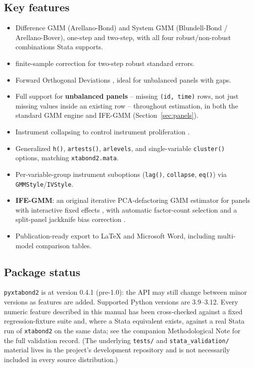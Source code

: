 \documentclass[11pt,a4paper]{article}
\newcommand{\pkg}{\texttt{pyxtabond2}}
\begin{document}
\subsection{Key features}
\begin{itemize}[nosep]
  \item Difference GMM (Arellano-Bond) and System GMM (Blundell-Bond /
        Arellano-Bover), one-step and two-step, with all four
        robust/non-robust combinations Stata supports.
  \item \citet{Windmeijer2005} finite-sample correction for two-step robust
        standard errors.
  \item Forward Orthogonal Deviations \citep{ArellanoBover1995}, ideal for
        unbalanced panels with gaps.
  \item Full support for \textbf{unbalanced panels} -- missing
        \texttt{(id, time)} rows, not just missing values inside an
        existing row -- throughout estimation, in both the standard GMM
        engine and IFE-GMM (Section~\ref{sec:panels}).
  \item Instrument collapsing to control instrument proliferation
        \citep{Roodman2009b}.
  \item Generalized \texttt{h()}, \texttt{artests()}, \texttt{arlevels}, and
        single-variable \texttt{cluster()} options, matching \texttt{xtabond2.mata}.
  \item Per-variable-group instrument suboptions (\texttt{lag()},
        \texttt{collapse}, \texttt{eq()}) via \texttt{GMMStyle}/\texttt{IVStyle}.
  \item \textbf{IFE-GMM}: an original iterative PCA-defactoring GMM
        estimator for panels with interactive fixed effects
        \citep{Bai2009}, with automatic factor-count selection
        \citep{BaiNg2002, AhnHorenstein2013} and a split-panel jackknife
        bias correction \citep{DhaeneJochmans2015}.
  \item Publication-ready export to \LaTeX{} and Microsoft Word, including
        multi-model comparison tables.
\end{itemize}

\subsection{Package status}
\pkg{} is at version 0.4.1 (pre-1.0): the API may still change between minor
versions as features are added. Supported Python versions are 3.9--3.12.
Every numeric feature described in this manual has been cross-checked
against a fixed regression-fixture suite and, where a Stata equivalent
exists, against a real Stata run of \texttt{xtabond2} on the same data; see
the companion Methodological Note for the full validation record. (The
underlying \texttt{tests/} and \texttt{stata\_validation/} material lives in
the project's development repository and is not necessarily included in
every source distribution.)
\end{document}

